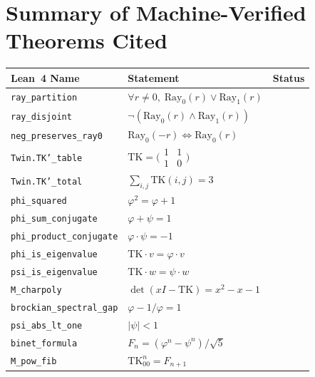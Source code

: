 \documentclass[11pt,a4paper]{article}
\newcommand{\lean}[1]{\texttt{\small #1}}
\newcommand{\verified}{\textcolor{green!60!black}{\checkmark}}
\begin{document}
\newpage
\appendix
\section{Summary of Machine-Verified Theorems Cited}\label{app:theorems}

\begin{table}[h]
\centering
\small
\begin{tabular}{@{}lll@{}}
\toprule
\textbf{Lean~4 Name} & \textbf{Statement} & \textbf{Status} \\
\midrule
\lean{ray\_partition} & $\forall r \neq 0,\; \mathrm{Ray}_0(r) \lor \mathrm{Ray}_1(r)$ & \verified \\
\lean{ray\_disjoint} & $\neg(\mathrm{Ray}_0(r) \land \mathrm{Ray}_1(r))$ & \verified \\
\lean{neg\_preserves\_ray0} & $\mathrm{Ray}_0(-r) \iff \mathrm{Ray}_0(r)$ & \verified \\
\lean{Twin.TK'\_table} & $\mathrm{TK} = \bigl(\begin{smallmatrix} 1 & 1 \\ 1 & 0 \end{smallmatrix}\bigr)$ & \verified \\
\lean{Twin.TK'\_total} & $\sum_{i,j}\mathrm{TK}(i,j) = 3$ & \verified \\
\lean{phi\_squared} & $\varphi^2 = \varphi + 1$ & \verified \\
\lean{phi\_sum\_conjugate} & $\varphi + \psi = 1$ & \verified \\
\lean{phi\_product\_conjugate} & $\varphi \cdot \psi = -1$ & \verified \\
\lean{phi\_is\_eigenvalue} & $\mathrm{TK} \cdot v = \varphi \cdot v$ & \verified \\
\lean{psi\_is\_eigenvalue} & $\mathrm{TK} \cdot w = \psi \cdot w$ & \verified \\
\lean{M\_charpoly} & $\det(xI - \mathrm{TK}) = x^2 - x - 1$ & \verified \\
\lean{brockian\_spectral\_gap} & $\varphi - 1/\varphi = 1$ & \verified \\
\lean{psi\_abs\_lt\_one} & $|\psi| < 1$ & \verified \\
\lean{binet\_formula} & $F_n = (\varphi^n - \psi^n)/\sqrt{5}$ & \verified \\
\lean{M\_pow\_fib} & $\mathrm{TK}^n_{00} = F_{n+1}$ & \verified \\

\end{tabular}
\end{table}
\end{document}
